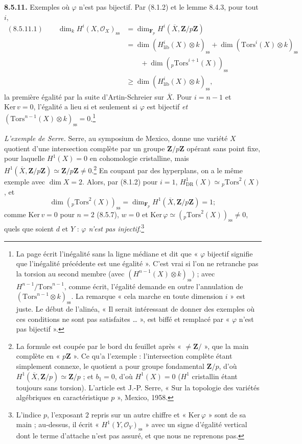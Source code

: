 \documentclass[11pt,a4paper]{article}
\begin{document}
\textbf{8.5.11.} Exemples où $\varphi$ n'est pas bijectif. Par (8.1.2) et le
lemme 8.4.3, pour tout $i$,
\[
\begin{aligned}
(8.5.11.1) \qquad \dim_{k} H^{i}(X, \mathcal{O}_{X})_{\mathrm{ss}} &=
\dim_{\mathbf{F}_{p}} H^{i}(\overline{X}, \mathbf{Z}/p\mathbf{Z}) \\
&= \dim (H^{i}_{\mathrm{lib}}(X) \otimes k)_{\mathrm{ss}}
+ \dim (\mathrm{Tors}^{i}(X) \otimes k)_{\mathrm{ss}} \\
&\qquad + \dim ({}_{p}\mathrm{Tors}^{i+1}(X))_{\mathrm{ss}} \\
&\geq \dim (H^{i}_{\mathrm{lib}}(X) \otimes k)_{\mathrm{ss}} ,
\end{aligned}
\]
la première égalité par la suite d'Artin-Schreier sur $\overline{X}$. Pour
$i = n - 1$ et $\mathrm{Ker}\, v = 0$, l'égalité a lieu si et seulement si
$\varphi$ est bijectif \emph{et} $(\mathrm{Tors}^{n-1}(X) \otimes
k)_{\mathrm{ss}} = 0$.\footnote{La page écrit l'inégalité sans la ligne
médiane et dit que « $\varphi$ bijectif signifie que l'inégalité précédente
est une égalité ». C'est vrai si l'on ne retranche pas la torsion au second
membre (avec $(H^{n-1}(X) \otimes k)_{\mathrm{ss}}$) ; avec
$H^{n-1}/\mathrm{Tors}^{n-1}$, comme écrit, l'égalité demande en outre
l'annulation de $(\mathrm{Tors}^{n-1} \otimes k)_{\mathrm{ss}}$. La
remarque « cela marche en toute dimension $i$ » est juste. Le début de
l'alinéa, « Il serait intéressant de donner des exemples où ces conditions
ne sont pas satisfaites \ldots{} », est biffé et remplacé par « $\varphi$
n'est pas bijectif ».}

\emph{L'exemple de Serre.} Serre, au symposium de Mexico, donne une variété
$X$ quotient d'une intersection complète par un groupe
$\mathbf{Z}/p\mathbf{Z}$ opérant sans point fixe, pour laquelle
$H^{1}(X) = 0$ en cohomologie cristalline, mais
$H^{1}(\overline{X}, \mathbf{Z}/p\mathbf{Z}) \simeq \mathbf{Z}/p\mathbf{Z}
\neq 0$.\footnote{La formule est coupée par le bord du feuillet après
« $\neq \mathbf{Z}/$ », que la main complète en « $p\mathbf{Z}$ ». Ce qu'a
l'exemple : l'intersection complète étant simplement connexe, le quotient a
pour groupe fondamental $\mathbf{Z}/p$, d'où $H^{1}(\overline{X},
\mathbf{Z}/p) \simeq \mathbf{Z}/p$ ; et $b_{1} = 0$, d'où $H^{1}(X) = 0$
($H^{1}$ cristallin étant toujours sans torsion). L'article est J.-P. Serre,
« Sur la topologie des variétés algébriques en caractéristique $p$ »,
Mexico, 1958.} En coupant par des hyperplans, on a le même exemple avec
$\dim X = 2$. Alors, par (8.1.2) pour $i = 1$, $H^{1}_{\mathrm{DR}}(X) \simeq
{}_{p}\mathrm{Tors}^{2}(X)$, et
\[
\dim ({}_{p}\mathrm{Tors}^{2}(X))_{\mathrm{ss}} =
\dim_{\mathbf{F}_{p}} H^{1}(\overline{X}, \mathbf{Z}/p\mathbf{Z}) = 1 ;
\]
comme $\mathrm{Ker}\, v = 0$ pour $n = 2$ (8.5.7), $w = 0$ et
$\mathrm{Ker}\, \varphi \simeq ({}_{p}\mathrm{Tors}^{2}(X))_{\mathrm{ss}} \neq
0$, quels que soient $d$ et $Y$ : \emph{$\varphi$ n'est pas
injectif}.\footnote{L'indice $p$, l'exposant $2$ repris sur un autre chiffre
et « $\mathrm{Ker}\, \varphi$ » sont de sa main ; au-dessus, il écrit
« $H^{1}(Y, \mathcal{O}_{Y})_{\mathrm{ss}}$ » avec un signe d'égalité
vertical dont le terme d'attache n'est pas assuré, et que nous ne
reprenons pas.}
\end{document}
